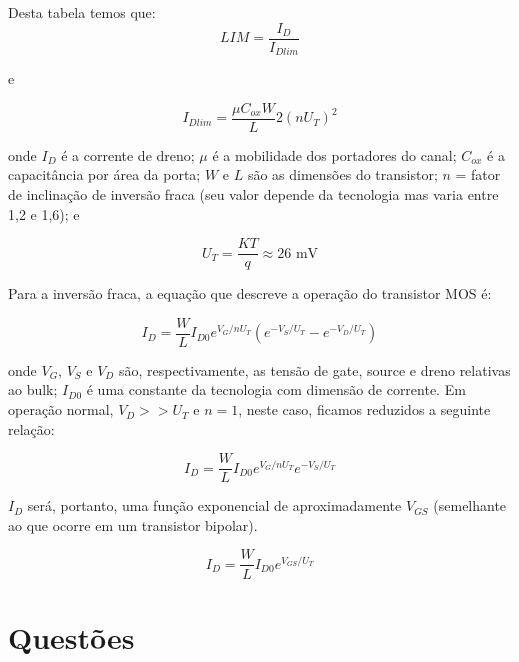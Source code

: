 ﻿\documentclass[12pt,a4paper]{article}
\begin{document}
Desta tabela temos que:
\begin{equation}
LIM = \frac{I_D}{I_{Dlim}}
\end{equation}

e

\begin{equation}
I_{Dlim} = \frac{\mu C_{ox} W}{L} 2 \left(nU_T\right)^2
\end{equation}

onde $I_D$ é a corrente de dreno; $\mu$ é a mobilidade dos portadores do canal; $C_{ox}$ é a capacitância por área da porta; $W$ e $L$ são as dimensões do transistor; $n$ = fator de inclinação de inversão fraca (seu valor depende da tecnologia mas varia entre 1,2 e 1,6); e

\begin{equation}
U_T = \frac{KT}{q} \approx 26 \text{ mV}
\end{equation}

Para a inversão fraca, a equação que descreve a operação do transistor MOS é:

\begin{equation}
I_D = \frac{W}{L} I_{D0} e^{V_G/nU_T} \left( e^{-V_S/U_T} - e^{-V_D/U_T} \right)
\end{equation}

onde $V_G$, $V_S$ e $V_D$ são, respectivamente, as tensão de gate, source e dreno relativas ao bulk; $I_{D0}$ é uma constante da tecnologia com dimensão de corrente. Em operação normal, $V_D >> U_T$ e $n = 1$, neste caso, ficamos reduzidos a seguinte relação:

\begin{equation}
I_D = \frac{W}{L} I_{D0} e^{V_G/nU_T} e^{-V_S/U_T}
\end{equation}

$I_D$ será, portanto, uma função exponencial de aproximadamente $V_{GS}$ (semelhante ao que ocorre em um transistor bipolar).

\begin{equation}
I_D = \frac{W}{L} I_{D0} e^{V_{GS}/U_T}
\end{equation}

\newpage

\section*{Questões}
\end{document}
